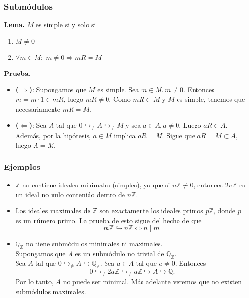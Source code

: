 \documentclass[notes=show]{beamer}%
\begin{document}
\begin{frame}
    \frametitle{Submódulos}
    \textbf{Lema.} \( M \) es simple si y solo si
    \begin{enumerate}
        \item \( M \neq 0\)
        \item \( \forall m \in M: \; m \neq 0 \Rightarrow mR = M \)
    \end{enumerate}
    \textbf{Prueba.}
    \begin{itemize}
        \item \textbf{(\( \Rightarrow \))}: 
        Supongamos que \( M \) es simple. Sea \( m \in M, m\neq 0 \). Entonces \( m = m \cdot 1 \in mR \), luego \(mR \neq 0\). 
        Como \(mR\subset M\) y \(M\) es simple, tenemos que necesariamente \( mR = M\). 
        \item \textbf{(\( \Leftarrow \))}: Sea \(A\) tal que \( 0 \hookrightarrow_{\neq} A \hookrightarrow_{\neq} M \) y sea \(a\in A, a\neq 0\).
        Luego \(aR\in A \). Además, por la hipótesis, \(a \in M\) implica \(aR = M\). Sigue que \(aR = M \subset A\), luego \(A = M\).
    \end{itemize}
\end{frame}

\begin{frame}
    \frametitle{Ejemplos}
    \begin{itemize}
        \item \( \mathbb{Z} \) no contiene ideales minimales (simples), ya que si \( n\mathbb{Z} \neq 0 \), 
        entonces \( 2n\mathbb{Z} \) es un ideal no nulo contenido dentro de \( n\mathbb{Z} \). 
        \item Los ideales maximales de \( \mathbb{Z} \) son exactamente los ideales primos \( p\mathbb{Z} \), donde \( p \) 
        es un número primo. La prueba de esto sigue del hecho de que
        \[
        m\mathbb{Z} \hookrightarrow n\mathbb{Z} \iff n \mid m.
        \]
        \item \( \mathbb{Q}_{\mathbb{Z}} \) no tiene submódulos minimales ni maximales.\\
        Supongamos que \( A \) es un submódulo no trivial de \( \mathbb{Q}_{\mathbb{Z}} \). \\
        Sea \(A\) tal que \( 0 \hookrightarrow_{\neq} A \hookrightarrow \mathbb{Q}_{\mathbb{Z}} \). 
        Sea \( a \in A\) tal que \(a\neq 0\).
        Entonces
        \[
        0 \hookrightarrow_{\neq} 2a\mathbb{Z} \hookrightarrow_{\neq} a\mathbb{Z} \hookrightarrow A \hookrightarrow \mathbb{Q}.
        \]
        Por lo tanto, \( A \) no puede ser minimal. 
        Más adelante veremos que no existen submódulos maximales.
    \end{itemize}
\end{frame}
\end{document}
